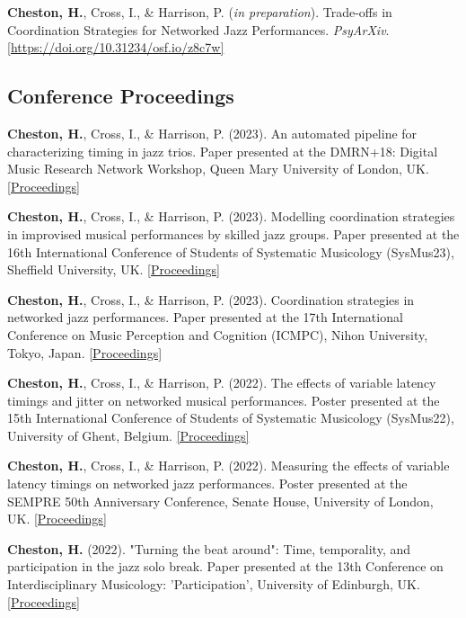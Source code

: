 \documentclass[11pt]{res} %
\begin{document}
\begin{resume}
\begin{hangparas}{.25in}{1}
\textbf{Cheston, H.}, Cross, I., \& Harrison, P. (\textit{in preparation}). Trade-offs in Coordination Strategies for Networked Jazz Performances. \emph{PsyArXiv}. \href{https://doi.org/10.31234/osf.io/z8c7w}{[https://doi.org/10.31234/osf.io/z8c7w]}
\end{hangparas}

\subsection{Conference Proceedings}
\begin{hangparas}{.25in}{1}
\textbf{Cheston, H.}, Cross, I., \& Harrison, P. (2023). An automated pipeline for characterizing timing in jazz trios. Paper presented at the DMRN+18: Digital Music Research Network Workshop, Queen Mary University of London, UK. \href{https://www.qmul.ac.uk/dmrn/media/dmrn/DMRN-18-Proceedings.pdf}{[Proceedings]}

\textbf{Cheston, H.}, Cross, I., \& Harrison, P. (2023). Modelling coordination strategies in improvised musical performances by skilled jazz groups. Paper presented at the 16th International Conference of Students of Systematic Musicology (SysMus23), Sheffield University, UK. \href{https://drive.google.com/file/d/14F5Xe8qfxfWpMW6pGuIl8fcaIYbmFDtt/view}{[Proceedings]}

\textbf{Cheston, H.}, Cross, I., \& Harrison, P. (2023). Coordination strategies in networked jazz performances. Paper presented at the 17th International Conference on Music Perception and Cognition (ICMPC), Nihon University, Tokyo, Japan. \href{https://icmpc17.com/proceedings-in-zip/ICMPC17-APSCOM7-e-Proceedings.zip/}{[Proceedings]}

\textbf{Cheston, H.}, Cross, I., \& Harrison, P. (2022). The effects of variable latency timings and jitter on networked musical performances. Poster presented at the 15th International Conference of Students of Systematic Musicology (SysMus22), University of Ghent, Belgium. \href{http://hdl.handle.net/1854/LU-01GVD6WBCVPGRAHMNYR1CEXF57}{[Proceedings]}

\textbf{Cheston, H.}, Cross, I., \& Harrison, P. (2022). Measuring the effects of variable latency timings on networked jazz performances. Poster presented at the SEMPRE 50th Anniversary Conference, Senate House, University of London, UK. \href{https://drive.google.com/file/d/1P72Orm1gqSI4_gOah3Ueb9fdCpriVY_M/view}{[Proceedings]}

\textbf{Cheston, H.} (2022). "Turning the beat around": Time, temporality, and participation in the jazz solo break. Paper presented at the 13th Conference on Interdisciplinary Musicology: 'Participation', University of Edinburgh, UK. \href{http://journals.ed.ac.uk/CIM22-Proceedings}{[Proceedings]}
\end{hangparas}


\end{resume}
\end{document}
